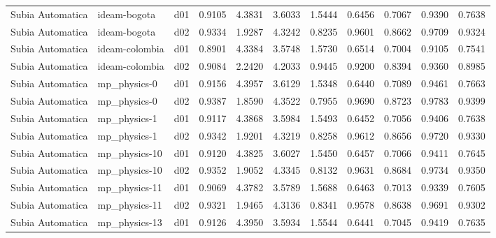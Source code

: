 \begin{longtable}{lllrrrrrrrr}
     Subia Automatica  &          ideam-bogota &     d01 &   0.9105 &   4.3831 &   3.6033 &       1.5444 &        0.6456 &       0.7067 &           0.9390 &  0.7638 \\
     Subia Automatica  &          ideam-bogota &     d02 &   0.9334 &   1.9287 &   4.3242 &       0.8235 &        0.9601 &       0.8662 &           0.9709 &  0.9324 \\
     Subia Automatica  &        ideam-colombia &     d01 &   0.8901 &   4.3384 &   3.5748 &       1.5730 &        0.6514 &       0.7004 &           0.9105 &  0.7541 \\
     Subia Automatica  &        ideam-colombia &     d02 &   0.9084 &   2.2420 &   4.2033 &       0.9445 &        0.9200 &       0.8394 &           0.9360 &  0.8985 \\
     Subia Automatica  &          mp\_physics-0 &     d01 &   0.9156 &   4.3957 &   3.6129 &       1.5348 &        0.6440 &       0.7089 &           0.9461 &  0.7663 \\
     Subia Automatica  &          mp\_physics-0 &     d02 &   0.9387 &   1.8590 &   4.3522 &       0.7955 &        0.9690 &       0.8723 &           0.9783 &  0.9399 \\
     Subia Automatica  &          mp\_physics-1 &     d01 &   0.9117 &   4.3868 &   3.5984 &       1.5493 &        0.6452 &       0.7056 &           0.9406 &  0.7638 \\
     Subia Automatica  &          mp\_physics-1 &     d02 &   0.9342 &   1.9201 &   4.3219 &       0.8258 &        0.9612 &       0.8656 &           0.9720 &  0.9330 \\
     Subia Automatica  &         mp\_physics-10 &     d01 &   0.9120 &   4.3825 &   3.6027 &       1.5450 &        0.6457 &       0.7066 &           0.9411 &  0.7645 \\
     Subia Automatica  &         mp\_physics-10 &     d02 &   0.9352 &   1.9052 &   4.3345 &       0.8132 &        0.9631 &       0.8684 &           0.9734 &  0.9350 \\
     Subia Automatica  &         mp\_physics-11 &     d01 &   0.9069 &   4.3782 &   3.5789 &       1.5688 &        0.6463 &       0.7013 &           0.9339 &  0.7605 \\
     Subia Automatica  &         mp\_physics-11 &     d02 &   0.9321 &   1.9465 &   4.3136 &       0.8341 &        0.9578 &       0.8638 &           0.9691 &  0.9302 \\
     Subia Automatica  &         mp\_physics-13 &     d01 &   0.9126 &   4.3950 &   3.5934 &       1.5544 &        0.6441 &       0.7045 &           0.9419 &  0.7635 \\

\end{longtable}
